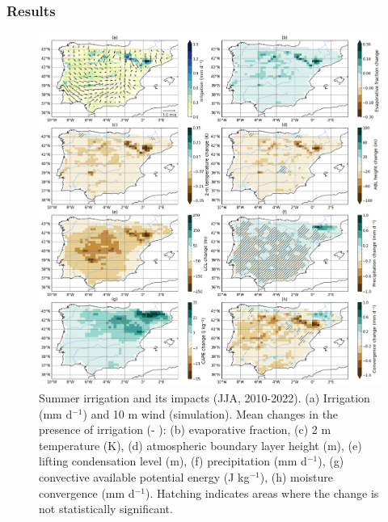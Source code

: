\subsubsection{Results}
\begin{figure}[htbp]
    \centering
    \includegraphics[width=15cm]{images/chap4/f07.png}
    \caption{Summer irrigation and its impacts (JJA, 2010-2022). (a) Irrigation (mm d$^{-1}$) and 10 m wind (\irr simulation). Mean changes in the presence of irrigation (\irr - \noirr): (b) evaporative fraction, (c) 2 m temperature (K), (d) atmospheric boundary layer height (m), (e) lifting condensation level (m), (f) precipitation (mm d$^{-1}$), (g) convective available potential energy (J kg$^{-1}$), (h) moisture convergence (mm d$^{-1}$). Hatching indicates areas where the change is not statistically significant.}
    \label{fig:diff_sig_6vars}
\end{figure}

